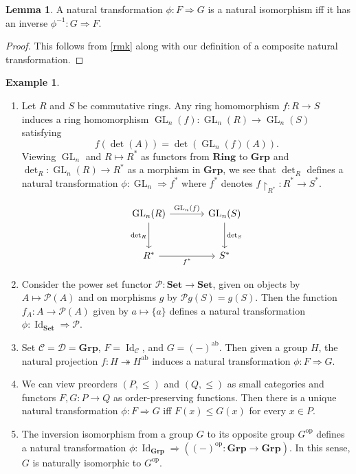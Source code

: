 \documentclass[10pt,letterpaper,cm]{nupset}
\theoremstyle{definition}
\newtheorem{exmp}[definition]{Example}
\theoremstyle{theorem}
\newtheorem{lemma}[definition]{Lemma}
\theoremstyle{remark}
\renewcommand{\P}{\mathcal P}
\newcommand{\1}{\mathbf{1}}
\renewcommand{\c}{\mathscr{C}}
\renewcommand{\d}{\mathscr{D}}
\newcommand{\0}{\vec 0}
\DeclareMathOperator*{\GL}{GL}
\DeclareMathOperator{\id}{Id}
\DeclareMathOperator{\op}{op}
\DeclareMathOperator{\ab}{ab}
\begin{document}
\begin{lemma}
A natural transformation $\phi: F \Rightarrow G$ is a natural isomorphism iff it has an inverse $\phi^{{-1}} : G \Rightarrow F$.
\end{lemma}
\begin{proof}
This follows from \cref{rmk} along with our definition of a composite natural transformation.
\end{proof}

\begin{exmp} $ $
\begin{enumerate}
\item Let $R$ and $S$ be commutative rings. Any ring homomorphism $f: R \to S$ induces a ring homomorphism $\GL_n(f): \GL_n(R) \to \GL_n(S)$ satisfying $$f(\det(A)) = \det\left(\GL_n(f)(A)\right).$$ Viewing $\GL_n$ and $R \mapsto R^{\ast}$ as functors from $\mathbf{Ring}$ to $\mathbf{Grp}$ and $\det_R : \GL_n(R) \to R^{\ast}$ as a morphism in $\mathbf{Grp}$, we see that $\det_R$ defines a natural transformation $\phi : \GL_n \Rightarrow f^{\ast}$ where $f^{\ast}$ denotes $f\restriction_{R^{\ast}} :R^{\ast} \to S^{\ast}$.  

\[
\begin{tikzcd}[row sep=large, column sep = large]
\GL_n(R) \arrow[r, "\GL_n(f)"] \arrow[d, "\det_R", swap]
& \GL_n(S) \arrow[d, "\det_S"] \\
R^{\ast} \arrow[r, "f^{\ast}"']
& S^{\ast}
\end{tikzcd}
\]
\item Consider the power set functor $\P: \mathbf{Set} \to \mathbf{Set}$, given on objects  by $A \mapsto \P(A)$ and on morphisms $g$  by $\P{g}(S) = g(S)$. Then the function $f_A: A \to \P(A)$ given by $a \mapsto \{a\}$ defines a natural transformation $\phi: \id_{\mathbf{Set}} \Rightarrow \P$.
\item 
Set $\c = \d = \mathbf{Grp}$, $F= \id_{\c}$, and $G =(-)^{\ab}$. Then given a group $H$, the natural projection $f: H \twoheadrightarrow H^{\ab}$ induces a natural transformation $\phi: F \Rightarrow G$.
\item 
We can view preorders $\left(P, \leq\right)$ and $\left(Q, \leq\right)$ as small categories and functors $F, G: P \to Q$ as order-preserving functions. Then there is a unique natural transformation $\phi: F \Rightarrow G$ iff $F(x) \leq G(x)$ for every $x\in P$.
\item 
The inversion isomorphism from a group $G$ to its opposite group $G^{\op}$ defines a natural transformation $\phi: \id_{\mathbf{Grp}} \Rightarrow \left((-)^{\op}: \mathbf{Grp} \to \mathbf{Grp}\right)$. In this sense, $G$ is naturally isomorphic to $G^{\op}$.
\end{enumerate}
\end{exmp}
\end{document}
